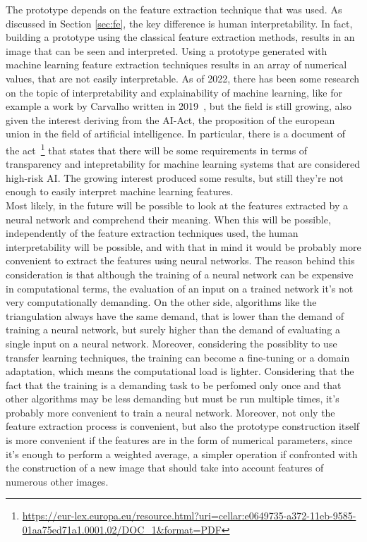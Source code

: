 \documentclass[conference]{IEEEtran}
\begin{document}
			\noindent The prototype depends on the feature extraction technique that was used. As discussed in Section \ref{sec:fe}, the key difference is human interpretability. In fact, building a prototype using the 
			classical feature extraction methods, results in an image that can be seen and interpreted. Using a prototype generated with machine learning feature extraction techniques results in an array 
			of numerical values, that are not easily interpretable. As of 2022, there has been some research on the topic of interpretability and explainability of machine learning, like for example 
			a work by Carvalho written in 2019~\cite{electronics8080832}, %
			but the field is still growing, also given the interest deriving from the AI-Act, the proposition of the european union in the field of artificial intelligence. In particular, there is a document of 
			the act~\footnote{\url{https://eur-lex.europa.eu/resource.html?uri=cellar:e0649735-a372-11eb-9585-01aa75ed71a1.0001.02/DOC_1&format=PDF}} that states that there will be some requirements in terms of 
			transparency and intepretability for machine learning systems that are considered high-risk AI. The growing interest produced some results, but still they're not enough to easily interpret machine learning 
			features.\\
			Most likely, in the future will be possible to look at the features extracted by a neural network and comprehend their meaning. When this will be possible, independently of the feature extraction techniques 
			used, the human interpretability will be possible, and with that in mind it would be probably more convenient to extract the features using neural networks. The reason behind this consideration is 
			that although the training of a neural network can be expensive in computational terms, the evaluation of an input on a trained network it's not very computationally demanding. On the other side, algorithms 
			like the triangulation always have the same demand, that is lower than the demand of training a neural network, but surely higher than the demand of evaluating a single input on a neural network. 
			Moreover, considering the possiblity to use transfer learning techniques, the training can become a fine-tuning or a domain adaptation, which means the computational load is lighter. Considering that 
			the fact that the training is a demanding task to be perfomed only once and that other algorithms may be less demanding but must be run multiple times, it's probably more convenient to train a neural 
			network. Moreover, not only the feature extraction process is convenient, but also the prototype construction itself is more convenient if the features are in the form of numerical parameters, since it's 
			enough to perform a weighted average, a simpler operation if confronted with the construction of a new image that should take into account features of numerous other images. 
\end{document}
